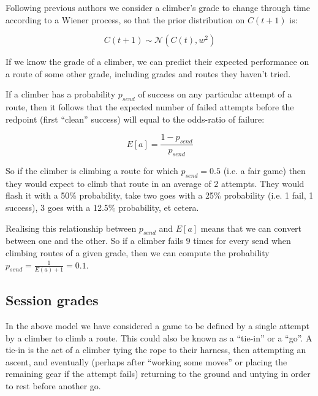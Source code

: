 \documentclass{article}
\begin{document}
Following previous authors  \cite{coulom2008whole,scarff2020estimation} we consider a climber's grade to change through time according to a Wiener process, so that the prior distribution on $C(t+1)$ is:

\begin{equation}
C(t+1) \sim \mathcal{N}(C(t), w^2)  
\end{equation}

If we know the grade of a climber, we can predict their expected performance on a route of some other grade, including grades and routes they haven't tried. 


If a climber has a probability $p_{send}$ of success on any particular attempt of a route, then it follows that the expected number of failed attempts before the redpoint (first ``clean'' success) will equal to the odds-ratio of failure:

\begin{equation}
 E\left[a\right]=\frac{1-p_{send}}{p_{send}}
 \end{equation} 
 
 So if the climber is climbing a route for which $p_{send}=0.5$ (i.e. a fair game) then they would expect to climb that route in an average of 2 attempts. They would flash it with a 50\% probability, take two goes with a 25\% probability (i.e. 1 fail, 1 success), 3 goes with a 12.5\% probability, et cetera.

Realising this relationship between $p_{send}$ and $ E\left[a\right]$ means that we can convert between one and the other. So if a climber fails $9$ times for every send when climbing routes of a given grade, then we can compute the probability  $p_{send} = \frac{1}{E(a)+1} = 0.1$.

\subsection*{Session grades}

In the above model we have considered a game to be defined by a single attempt by a climber to climb a route. This could also be known as a ``tie-in'' or a ``go''. A tie-in is the act of a climber tying the rope to their harness, then attempting an ascent, and eventually (perhaps after ``working some moves'' or placing the remaining gear if the attempt fails) returning to the ground and untying in order to rest before another go.
\end{document}
